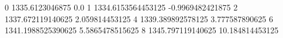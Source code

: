0 1335.6123046875 0.0
1 1334.6153564453125 -0.9969482421875
2 1337.672119140625 2.059814453125
4 1339.389892578125 3.777587890625
6 1341.1988525390625 5.5865478515625
8 1345.797119140625 10.184814453125
